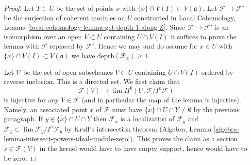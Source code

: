\begin{proof}

Let $T \subset U$ be the set of points $x$ with
$\overline{\{x\}} \cap V(I) \subset V(\mathfrak a)$.
Let $\mathcal{F} \to \mathcal{F}'$ be the surjection
of coherent modules on $U$ constructed in
Local Cohomology, Lemma \ref{local-cohomology-lemma-get-depth-1-along-Z}.
Since $\mathcal{F} \to \mathcal{F}'$ is an isomorphism
over an open $V \subset U$ containing $U \cap V(I)$
it suffices to prove the lemma with $\mathcal{F}$ replaced
by $\mathcal{F}'$. Hence we may and do assume
for $x \in U$ with $\overline{\{x\}} \cap V(I) \subset V(\mathfrak a)$
we have $\text{depth}(\mathcal{F}_x) \geq 1$.

\medskip\noindent
Let $\mathcal{V}$ be the set of open subschemes $V \subset U$
containing $U \cap V(I)$ ordered by reverse inclusion.
This is a directed set. We first claim that
$$
\mathcal{F}(V)
\longrightarrow
\lim H^0(U, \mathcal{F}/I^n\mathcal{F})
$$
is injective for any $V \in \mathcal{F}$ (and in particular the map
of the lemma is injective). Namely, an associated point $x$ of $\mathcal{F}$
must have $\overline{\{x\}} \cap U \cap Y \not = \emptyset$
by the previous paragraph. If $y \in \overline{\{x\}} \cap U \cap Y$ then
$\mathcal{F}_x$ is a localization of $\mathcal{F}_y$
and $\mathcal{F}_y \subset \lim \mathcal{F}_y/I^n \mathcal{F}_y$
by Krull's intersection theorem
(Algebra, Lemma \ref{algebra-lemma-intersect-powers-ideal-module-zero}).
This proves the claim as a section $s \in \mathcal{F}(V)$
in the kernel would have to have empty support, hence would have to be zero.


\end{proof}
